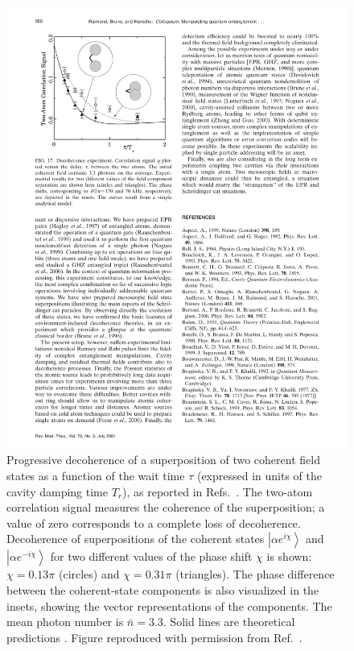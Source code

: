 \documentclass[3p,sort&compress,12pt]{elsarticle}
\newcommand{\ket}[1]{\left\vert{#1}\right\rangle}
\newcommand{\E}{\ensuremath{e}}
\newcommand{\I}{\ensuremath{i}}
\begin{document}
\begin{figure}
\centering
\includegraphics[scale=.7]{twoatomcorr.pdf}
\caption{Progressive decoherence of a superposition of two coherent field states as a function of the wait time $\tau$ (expressed in units of the cavity damping time $T_r$), as reported in Refs.~\cite{Brune:1996:om,Maitre:1997:tv}. The two-atom correlation signal measures the coherence of the superposition; a value of zero corresponds to a complete loss of decoherence. Decoherence of superpositions of the coherent states $\ket{\alpha \E^{\I \chi}}$ and $\ket{\alpha \E^{-\I \chi}}$ for two different values of the phase shift $\chi$ is shown: $\chi=0.13\pi$ (circles) and $\chi=0.31\pi$ (triangles). The phase difference between the coherent-state components is also visualized in the insets, showing the vector representations of the components. The mean photon number is $\bar{n}=3.3$. Solid lines are theoretical predictions \cite{Davidovich:1996:sa,Maitre:1997:tv}.  Figure reproduced with permission from Ref.~\cite{Raimond:2001:aa}.}
\label{fig:twoatom}
\end{figure}
\end{document}
